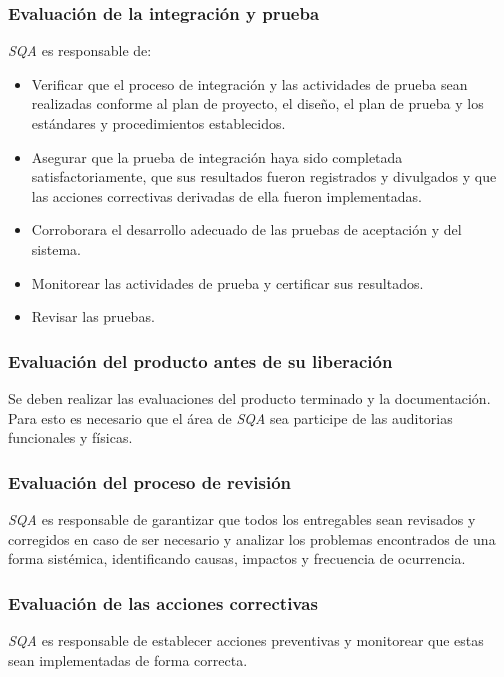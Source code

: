\subsubsection{Evaluación de la integración y prueba}

\textit{SQA} es responsable de:

	\begin{itemize}
		\item 
		Verificar que el proceso de integración y las actividades de prueba sean realizadas conforme al plan de proyecto, el diseño, el plan de prueba y los estándares y procedimientos establecidos.
		\item
		Asegurar que la prueba de integración haya sido completada satisfactoriamente, que sus resultados fueron registrados y divulgados y que las acciones correctivas derivadas de ella fueron implementadas.
		\item	
		Corroborara el desarrollo adecuado de las pruebas de aceptación y del sistema.
		\item
		Monitorear las actividades de prueba y certificar sus resultados.
		\item
		Revisar las pruebas.
	\end{itemize}

\subsubsection{Evaluación del producto antes de su liberación}

Se deben realizar las evaluaciones del producto terminado y la documentación. Para esto es necesario que el área de \textit{SQA} sea participe de las auditorias funcionales y físicas. 

\subsubsection{Evaluación del proceso de revisión}

\textit{SQA} es responsable de garantizar que todos los entregables sean revisados y corregidos en caso de ser necesario y analizar los problemas encontrados de una forma sistémica, identificando causas, impactos y frecuencia de ocurrencia.

\subsubsection{Evaluación de las acciones correctivas}

\textit{SQA} es responsable de establecer acciones preventivas y monitorear que estas sean implementadas de forma correcta. 

